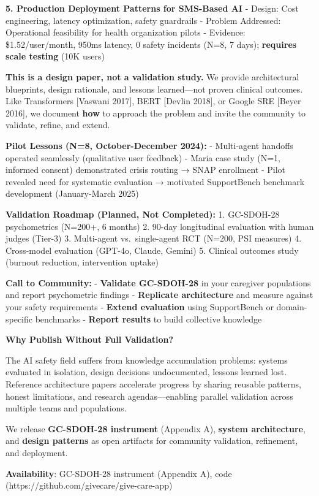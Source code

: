 \documentclass[
]{article}
\begin{document}
\textbf{5. Production Deployment Patterns for SMS-Based AI} - Design:
Cost engineering, latency optimization, safety guardrails - Problem
Addressed: Operational feasibility for health organization pilots -
Evidence: \$1.52/user/month, 950ms latency, 0 safety incidents (N=8, 7
days); \textbf{requires scale testing} (10K users)

\textbf{This is a design paper, not a validation study.} We provide
architectural blueprints, design rationale, and lessons learned---not
proven clinical outcomes. Like Transformers {[}Vaswani 2017{]}, BERT
{[}Devlin 2018{]}, or Google SRE {[}Beyer 2016{]}, we document
\textbf{how} to approach the problem and invite the community to
validate, refine, and extend.

\textbf{Pilot Lessons (N=8, October-December 2024):} - Multi-agent
handoffs operated seamlessly (qualitative user feedback) - Maria case
study (N=1, informed consent) demonstrated crisis routing → SNAP
enrollment - Pilot revealed need for systematic evaluation → motivated
SupportBench benchmark development (January-March 2025)

\textbf{Validation Roadmap (Planned, Not Completed):} 1. GC-SDOH-28
psychometrics (N=200+, 6 months) 2. 90-day longitudinal evaluation with
human judges (Tier-3) 3. Multi-agent vs.~single-agent RCT (N=200, PSI
measures) 4. Cross-model evaluation (GPT-4o, Claude, Gemini) 5. Clinical
outcomes study (burnout reduction, intervention uptake)

\textbf{Call to Community:} - \textbf{Validate GC-SDOH-28} in your
caregiver populations and report psychometric findings -
\textbf{Replicate architecture} and measure against your safety
requirements - \textbf{Extend evaluation} using SupportBench or
domain-specific benchmarks - \textbf{Report results} to build collective
knowledge

\textbf{Why Publish Without Full Validation?}

The AI safety field suffers from knowledge accumulation problems:
systems evaluated in isolation, design decisions undocumented, lessons
learned lost. Reference architecture papers accelerate progress by
sharing reusable patterns, honest limitations, and research
agendas---enabling parallel validation across multiple teams and
populations.

We release \textbf{GC-SDOH-28 instrument} (Appendix A), \textbf{system
architecture}, and \textbf{design patterns} as open artifacts for
community validation, refinement, and deployment.

\textbf{Availability}: GC-SDOH-28 instrument (Appendix A), code
(https://github.com/givecare/give-care-app)
\end{document}
